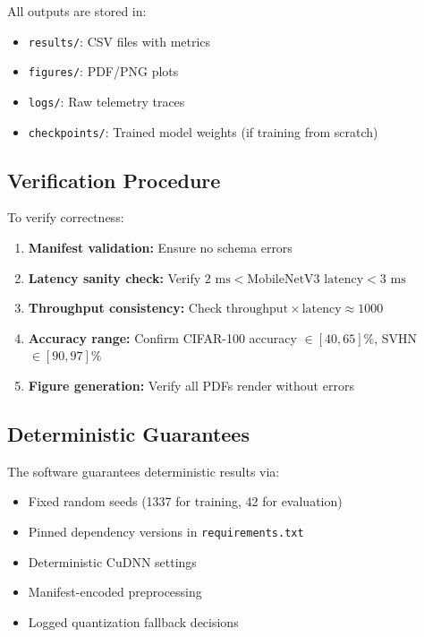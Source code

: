 \documentclass[review]{elsarticle}
\begin{document}
All outputs are stored in:

\begin{itemize}
\item \texttt{results/}: CSV files with metrics
\item \texttt{figures/}: PDF/PNG plots
\item \texttt{logs/}: Raw telemetry traces
\item \texttt{checkpoints/}: Trained model weights (if training from scratch)
\end{itemize}

\subsection{Verification Procedure}

To verify correctness:

\begin{enumerate}
\item \textbf{Manifest validation:} Ensure no schema errors
\item \textbf{Latency sanity check:} Verify $2 \text{ ms} < \text{MobileNetV3 latency} < 3 \text{ ms}$
\item \textbf{Throughput consistency:} Check $\text{throughput} \times \text{latency} \approx 1000$
\item \textbf{Accuracy range:} Confirm CIFAR-100 accuracy $\in [40, 65]\%$, SVHN $\in [90, 97]\%$
\item \textbf{Figure generation:} Verify all PDFs render without errors
\end{enumerate}

\subsection{Deterministic Guarantees}

The software guarantees deterministic results via:

\begin{itemize}
\item Fixed random seeds (1337 for training, 42 for evaluation)
\item Pinned dependency versions in \texttt{requirements.txt}
\item Deterministic CuDNN settings
\item Manifest-encoded preprocessing
\item Logged quantization fallback decisions
\end{itemize}
\end{document}
